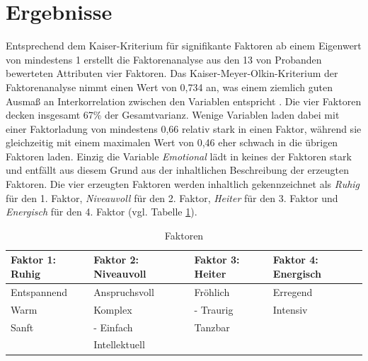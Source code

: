 \section*{Ergebnisse}
\label{sec:Ergebnisse}

Entsprechend dem Kaiser-Kriterium für signifikante Faktoren ab einem Eigenwert von mindestens 1 erstellt die Faktorenanalyse aus den 13 von Probanden bewerteten Attributen vier Faktoren.
Das Kaiser-Meyer-Olkin-Kriterium der Faktorenanalyse nimmt einen Wert von 0,734 an, was einem ziemlich guten Ausmaß an Interkorrelation zwischen den Variablen entspricht \cite{eckey2002multivariate}.
Die vier Faktoren decken insgesamt 67\% der Gesamtvarianz.
Wenige Variablen laden dabei mit einer Faktorladung von mindestens 0,66 relativ stark in einen Faktor, während sie gleichzeitig mit einem maximalen Wert von 0,46 eher schwach in die übrigen Faktoren laden.
Einzig die Variable \textit{Emotional} lädt in keines der Faktoren stark und entfällt aus diesem Grund aus der inhaltlichen Beschreibung der erzeugten Faktoren.
Die vier erzeugten Faktoren werden inhaltlich gekennzeichnet als \textit{Ruhig} für den 1. Faktor, \textit{Niveauvoll} für den 2. Faktor, \textit{Heiter} für den 3. Faktor und \textit{Energisch} für den 4. Faktor (vgl. Tabelle \ref{tab:faktoren}).   


\begin{table}[htbp]
    \centering
    \caption{Faktoren}
    \vspace{2mm}
    \label{tab:faktoren}
        \begin{tabularx}{8cm}{|X|X|X|X|}
            \hline Faktor 1: \textbf{Ruhig} & Faktor 2: \textbf{Niveauvoll} & Faktor 3: \textbf{Heiter} & Faktor 4: \textbf{Energisch} \\
            \hline Entspan\-nend & Anspruchs\-voll       & Fröhlich             & Erregend \\
            \hline Warm              & Komplex                  & - Traurig            & Intensiv \\
            \hline Sanft               & - Einfach                 & Tanzbar             & \\
            \hline                        & Intellek\-tuell          &                          & \\
            \hline
        \end{tabularx}
\end{table}


